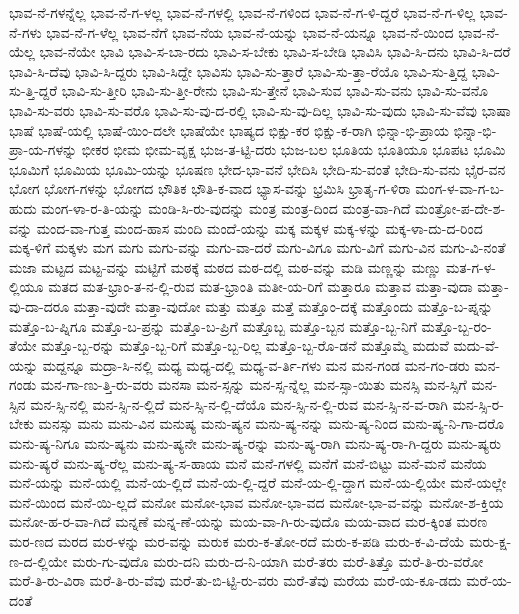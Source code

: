 {ಭಾವ-ನೆ-ಗಳನ್ನೆಲ್ಲ
ಭಾವ-ನೆ-ಗ-ಳಲ್ಲ
ಭಾವ-ನೆ-ಗಳಲ್ಲಿ
ಭಾವ-ನೆ-ಗಳಿಂದ
ಭಾವ-ನೆ-ಗ-ಳಿ-ದ್ದರೆ
ಭಾವ-ನೆ-ಗ-ಳಿಲ್ಲ
ಭಾವ-ನೆ-ಗಳು
ಭಾವ-ನೆ-ಗ-ಳೆಲ್ಲ
ಭಾವ-ನೆಗೆ
ಭಾವ-ನೆಯ
ಭಾವ-ನೆ-ಯನ್ನು
ಭಾವ-ನೆ-ಯನ್ನೂ
ಭಾವ-ನೆ-ಯಿಂದ
ಭಾವ-ನೆ-ಯೆಲ್ಲ
ಭಾವ-ನೆಯೇ
ಭಾವಿ
ಭಾವಿ-ಸ-ಬಾ-ರದು
ಭಾವಿ-ಸ-ಬೇಕು
ಭಾವಿ-ಸ-ಬೇಡಿ
ಭಾವಿಸಿ
ಭಾವಿ-ಸಿ-ದನು
ಭಾವಿ-ಸಿ-ದರೆ
ಭಾವಿ-ಸಿ-ದೆವು
ಭಾವಿ-ಸಿ-ದ್ದರು
ಭಾವಿ-ಸಿದ್ದೇ
ಭಾವಿಸು
ಭಾವಿ-ಸು-ತ್ತಾರೆ
ಭಾವಿ-ಸು-ತ್ತಾ-ರೆಯೊ
ಭಾವಿ-ಸು-ತ್ತಿದ್ದ
ಭಾವಿ-ಸು-ತ್ತಿ-ದ್ದರೆ
ಭಾವಿ-ಸು-ತ್ತೀರಿ
ಭಾವಿ-ಸು-ತ್ತೀ-ರೇನು
ಭಾವಿ-ಸು-ತ್ತೇನೆ
ಭಾವಿ-ಸುವ
ಭಾವಿ-ಸು-ವನು
ಭಾವಿ-ಸು-ವನೊ
ಭಾವಿ-ಸು-ವರು
ಭಾವಿ-ಸು-ವರೊ
ಭಾವಿ-ಸು-ವು-ದ-ರಲ್ಲಿ
ಭಾವಿ-ಸು-ವು-ದಿಲ್ಲ
ಭಾವಿ-ಸು-ವುದು
ಭಾವಿ-ಸು-ವೆವು
ಭಾಷಾ
ಭಾಷೆ
ಭಾಷೆ-ಯಲ್ಲಿ
ಭಾಷೆ-ಯಿಂ-ದಲೇ
ಭಾಷೆಯೇ
ಭಾಷ್ಯದ
ಭಿಕ್ಷು-ಕರ
ಭಿಕ್ಷು-ಕ-ರಾಗಿ
ಭಿನ್ನಾ-ಭಿ-ಪ್ರಾಯ
ಭಿನ್ನಾ-ಭಿ-ಪ್ರಾ-ಯ-ಗಳನ್ನು
ಭೀಕರ
ಭೀಮ
ಭೀಮ-ವೃಕ್ಷ
ಭುಜ-ತ-ಟ್ಟಿ-ದರು
ಭುಜ-ಬಲ
ಭೂತಿಯ
ಭೂತಿಯೂ
ಭೂಪಟ
ಭೂಮಿ
ಭೂಮಿಗೆ
ಭೂಮಿಯ
ಭೂಮಿ-ಯನ್ನು
ಭೂಷಣ
ಭೇದ-ಭಾ-ವನೆ
ಭೇದಿಸಿ
ಭೇದಿ-ಸು-ವಂತೆ
ಭೇದಿ-ಸು-ವನು
ಭೈರ-ವನ
ಭೋಗ
ಭೋಗ-ಗಳನ್ನು
ಭೋಗದ
ಭೌತಿಕ
ಭೌತಿ-ಕ-ವಾದ
ಭ್ಯಾಸ-ವನ್ನು
ಭ್ರಮಿಸಿ
ಭ್ರಾತೃ-ಗ-ಳಿರಾ
ಮಂಗ-ಳ-ವಾ-ಗ-ಬ-ಹುದು
ಮಂಗ-ಳಾ-ರ-ತಿ-ಯನ್ನು
ಮಂಡಿ-ಸಿ-ರು-ವುದನ್ನು
ಮಂತ್ರ
ಮಂತ್ರ-ದಿಂದ
ಮಂತ್ರ-ವಾ-ಗಿದೆ
ಮಂತ್ರೋ-ಪ-ದೇ-ಶ-ವನ್ನು
ಮಂದ-ವಾ-ಗುತ್ತ
ಮಂದ-ಹಾಸ
ಮಂದಿ
ಮಂದೆ-ಯನ್ನು
ಮಕ್ಕ
ಮಕ್ಕಳ
ಮಕ್ಕ-ಳನ್ನು
ಮಕ್ಕ-ಳಾ-ದು-ದ-ರಿಂದ
ಮಕ್ಕ-ಳಿಗೆ
ಮಕ್ಕಳು
ಮಗ
ಮಗು
ಮಗು-ವನ್ನು
ಮಗು-ವಾ-ದರೆ
ಮಗು-ವಿಗೂ
ಮಗು-ವಿಗೆ
ಮಗು-ವಿನ
ಮಗು-ವಿ-ನಂತೆ
ಮಜಾ
ಮಟ್ಟದ
ಮಟ್ಟ-ವನ್ನು
ಮಟ್ಟಿಗೆ
ಮಠಕ್ಕೆ
ಮಠದ
ಮಠ-ದಲ್ಲಿ
ಮಠ-ವನ್ನು
ಮಡಿ
ಮಣ್ಣನ್ನು
ಮಣ್ಣು
ಮತ-ಗ-ಳ-ಲ್ಲಿಯೂ
ಮತದ
ಮತ-ಭ್ರಾಂ-ತ-ನ-ಲ್ಲಿ-ರುವ
ಮತ-ಭ್ರಾಂತಿ
ಮತೀ-ಯ-ರಿಗೆ
ಮತ್ತಾರೂ
ಮತ್ತಾವ
ಮತ್ತಾ-ವುದಾ
ಮತ್ತಾ-ವು-ದಾ-ದರೂ
ಮತ್ತಾ-ವುದೇ
ಮತ್ತಾ-ವುದೋ
ಮತ್ತು
ಮತ್ತೂ
ಮತ್ತೆ
ಮತ್ತೊಂ-ದಕ್ಕೆ
ಮತ್ತೊಂದು
ಮತ್ತೊ-ಬ-ಪ್ನನ್ನು
ಮತ್ತೊ-ಬ-ಪ್ನಿಗೂ
ಮತ್ತೊ-ಬ-ಪ್ರನ್ನು
ಮತ್ತೊ-ಬ-ಪ್ರಿಗೆ
ಮತ್ತೊಬ್ಬ
ಮತ್ತೊ-ಬ್ಬನ
ಮತ್ತೊ-ಬ್ಬ-ನಿಗೆ
ಮತ್ತೊ-ಬ್ಬ-ರಂ-ತೆಯೇ
ಮತ್ತೊ-ಬ್ಬ-ರನ್ನು
ಮತ್ತೊ-ಬ್ಬ-ರಿಗೆ
ಮತ್ತೊ-ಬ್ಬ-ರಿಲ್ಲ
ಮತ್ತೊ-ಬ್ಬ-ರೊ-ಡನೆ
ಮತ್ತೊಮ್ಮೆ
ಮದುವೆ
ಮದು-ವೆ-ಯನ್ನು
ಮದ್ದನ್ನೂ
ಮದ್ರಾ-ಸಿ-ನಲ್ಲಿ
ಮಧ್ಯ
ಮಧ್ಯ-ದಲ್ಲಿ
ಮಧ್ಯ-ವ-ರ್ತಿ-ಗಳು
ಮನ
ಮನ-ಗಂಡ
ಮನ-ಗಂ-ಡರು
ಮನ-ಗಂಡು
ಮನ-ಗಾ-ಣು-ತ್ತಿ-ರು-ವರು
ಮನಸಾ
ಮನ-ಸ್ಸನ್ನು
ಮನ-ಸ್ಸ-ನ್ನೆಲ್ಲ
ಮನ-ಸ್ಸಾ-ಯಿತು
ಮನಸ್ಸಿ
ಮನ-ಸ್ಸಿಗೆ
ಮನ-ಸ್ಸಿನ
ಮನ-ಸ್ಸಿ-ನಲ್ಲಿ
ಮನ-ಸ್ಸಿ-ನ-ಲ್ಲಿದೆ
ಮನ-ಸ್ಸಿ-ನ-ಲ್ಲಿ-ದೆಯೊ
ಮನ-ಸ್ಸಿ-ನ-ಲ್ಲಿ-ರುವ
ಮನ-ಸ್ಸಿ-ನ-ವ-ರಾಗಿ
ಮನ-ಸ್ಸಿ-ರ-ಬೇಕು
ಮನಸ್ಸು
ಮನು
ಮನು-ವಿನ
ಮನುಷ್ಯ
ಮನು-ಷ್ಯನ
ಮನು-ಷ್ಯ-ನನ್ನು
ಮನು-ಷ್ಯ-ನಿಂದ
ಮನು-ಷ್ಯ-ನಿ-ಗಾ-ದರೊ
ಮನು-ಷ್ಯ-ನಿಗೂ
ಮನು-ಷ್ಯನು
ಮನು-ಷ್ಯನೇ
ಮನು-ಷ್ಯ-ರನ್ನು
ಮನು-ಷ್ಯ-ರಾಗಿ
ಮನು-ಷ್ಯ-ರಾ-ಗಿ-ದ್ದರು
ಮನು-ಷ್ಯರು
ಮನು-ಷ್ಯರೆ
ಮನು-ಷ್ಯ-ರೆಲ್ಲ
ಮನು-ಷ್ಯ-ಸ-ಹಾಯ
ಮನೆ
ಮನೆ-ಗಳಲ್ಲಿ
ಮನೆಗೆ
ಮನೆ-ಬಿಟ್ಟು
ಮನೆ-ಮನೆ
ಮನೆಯ
ಮನೆ-ಯನ್ನು
ಮನೆ-ಯಲ್ಲಿ
ಮನೆ-ಯ-ಲ್ಲಿದೆ
ಮನೆ-ಯ-ಲ್ಲಿ-ದ್ದರೆ
ಮನೆ-ಯ-ಲ್ಲಿ-ದ್ದಾಗ
ಮನೆ-ಯ-ಲ್ಲಿಯೇ
ಮನೆ-ಯಲ್ಲೇ
ಮನೆ-ಯಿಂದ
ಮನೆ-ಯಿ-ಲ್ಲದೆ
ಮನೋ
ಮನೋ-ಭಾವ
ಮನೋ-ಭಾ-ವದ
ಮನೋ-ಭಾ-ವ-ವನ್ನು
ಮನೋ-ಶ-ಕ್ತಿಯ
ಮನೋ-ಹ-ರ-ವಾ-ಗಿದೆ
ಮನ್ನಣೆ
ಮನ್ನ-ಣೆ-ಯನ್ನು
ಮಯ-ವಾ-ಗಿ-ರು-ವುದೊ
ಮಯ-ವಾದ
ಮರ-ಕ್ಕಿಂತ
ಮರಣ
ಮರ-ಣದ
ಮರದ
ಮರ-ಳನ್ನು
ಮರ-ವನ್ನು
ಮರುಕ
ಮರು-ಕ-ತೋ-ರದೆ
ಮರು-ಕ-ಪಡಿ
ಮರು-ಕ-ವಿ-ದೆಯೆ
ಮರು-ಕ್ಷ-ಣ-ದ-ಲ್ಲಿಯೇ
ಮರು-ಗು-ವುದೊ
ಮರು-ದನಿ
ಮರು-ದ-ನಿ-ಯಾಗಿ
ಮರೆ-ತರು
ಮರೆ-ತಿತ್ತೊ
ಮರೆ-ತಿ-ರು-ವರೋ
ಮರೆ-ತಿ-ರು-ವಿರಾ
ಮರೆ-ತಿ-ರು-ವೆವು
ಮರೆ-ತು-ಬಿ-ಟ್ಟಿ-ರು-ವರು
ಮರೆ-ತೆವು
ಮರೆಯ
ಮರೆ-ಯ-ಕೂ-ಡದು
ಮರೆ-ಯ-ದಂತೆ
}
